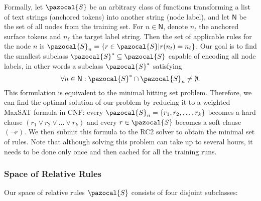 \documentclass[11pt,a4paper]{article}
\begin{document}
Formally, let $\pazocal{S}$ be an arbitrary class of functions transforming a list of text strings (anchored tokens) into another string (node label), and let $\mathsf{N}$ be the set of all nodes from the training set. For \hbox{$n \in \mathsf{N}$}, denote $n_t$ the anchored surface tokens and $n_\ell$ the target label string. Then the set of applicable rules for the node $n$ is $\pazocal{S}_n = \left\{r \in \pazocal{S} | r(n_t) = n_\ell \right\}$. Our goal is to find the smallest subclass $\pazocal{S}^* \subseteq \pazocal{S}$ capable of encoding all node labels, in other words a subclass $\pazocal{S}^*$ satisfying
$$
  \forall n \in \mathsf{N}: \pazocal{S}^* \cap \pazocal{S}_n \neq \emptyset.
$$
This formulation is equivalent to the minimal hitting set problem. Therefore, we can find the optimal solution of our problem by reducing it to a weighted MaxSAT formula in CNF: every $\pazocal{S}_n = \left\{r_1, r_2, \ldots, r_k \right\}$ becomes a hard clause $(r_1 \vee r_2 \vee \ldots \vee r_k)$ and every $r \in \pazocal{S}$ becomes a soft clause $(\neg r)$. 
We then submit this formula to the RC2 solver \cite{ignatiev2019rc2} to obtain the minimal set of rules. Note that although solving this problem can take up to several hours, it needs to be done only once and then cached for all the training runs.

\subsubsection{Space of Relative Rules}

Our space of relative rules $\pazocal{S}$ consists of four disjoint subclasses:
\end{document}

